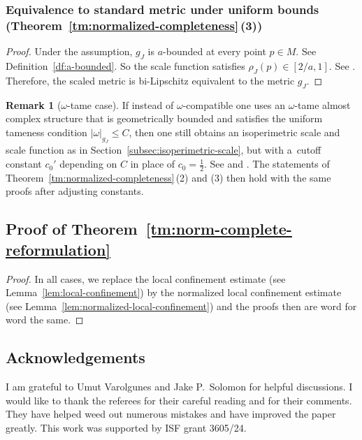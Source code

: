 \documentclass[pdftex]{sigma}
\numberwithin{equation}{section}
\theoremstyle{definition}
\newtheorem{rem}[Theorem]{Remark}
\begin{document}
\subsubsection[Equivalence to standard metric under uniform bounds (Theorem 1.16 (3))]{Equivalence to standard metric under uniform bounds (Theorem~\ref{tm:normalized-completeness}\,(3))}
\begin{proof}%
Under the assumption,
$g_J$ is $a$-bounded at every point $p\in M$. See Definition~\ref{df:a-bounded}. So the scale function satisfies $\rho_J(p)\in [2/a,1]$. See \cite[Lemma~4.10]{GromanFloerOpen}. Therefore, the scaled metric is bi-Lipschitz equivalent to the metric $g_J$.
\end{proof}

\begin{rem}[$\omega$-tame case]\label{rem:omega-tame}
If instead of $\omega$-compatible one uses an $\omega$-tame almost complex structure that is geometrically bounded and satisfies the uniform tameness condition $|\omega|_{g_J}\le C$, then one still obtains an isoperimetric scale and scale function as in Section~\ref{subsec:isoperimetric-scale}, but with a~cutoff constant $c_0'$ depending on $C$ in place of $c_0=\tfrac12$. See \cite[Section~4.4]{McDuffSalamonJHol} and \cite[Section~3, Appendix~B]{GromanWrappedSemiToricSYZ}. The statements of Theorem~\ref{tm:normalized-completeness}\,(2) and (3) then hold with the same proofs after adjusting constants.
\end{rem}

\subsection{Proof of Theorem~\ref{tm:norm-complete-reformulation}}
\begin{proof}
In all cases, we replace the local confinement estimate (see Lemma~\ref{lem:local-confinement}) by the normalized local confinement estimate (see Lemma~\ref{lem:normalized-local-confinement}) and the proofs then are word for word the same.
\end{proof}

\subsection*{Acknowledgements}
I am grateful to Umut Varolgunes and Jake P.\ Solomon for helpful discussions. I would like to thank the referees for their careful reading and for their comments. They have helped weed out numerous mistakes and have improved the paper greatly.
This work was supported by ISF grant 3605/24.
\end{document}
